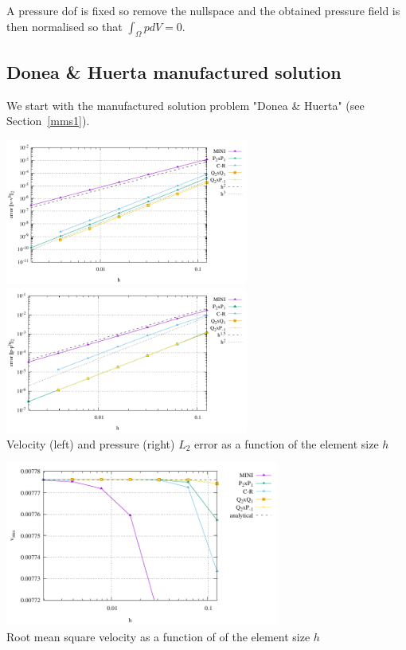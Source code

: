 A pressure dof is fixed so remove the nullspace and the obtained pressure field
is then normalised so that $\int_\Omega p dV = 0$.

\subsection*{Donea \& Huerta manufactured solution}

We start with the manufactured solution problem "Donea \& Huerta" (see Section~\ref{mms1}).
\begin{center}
\includegraphics[width=8cm]{python_codes/fieldstone_112/results/exp1/errors_V.pdf}
\includegraphics[width=8cm]{python_codes/fieldstone_112/results/exp1/errors_P.pdf}\\
{\captionfont Velocity (left) and pressure (right) $L_2$ error as a function of the element size $h$}
\end{center}

\begin{center}
\includegraphics[width=9cm]{python_codes/fieldstone_112/results/exp1/vrms.pdf}\\
{\captionfont Root mean square velocity as a function of of the element size $h$}
\end{center}

